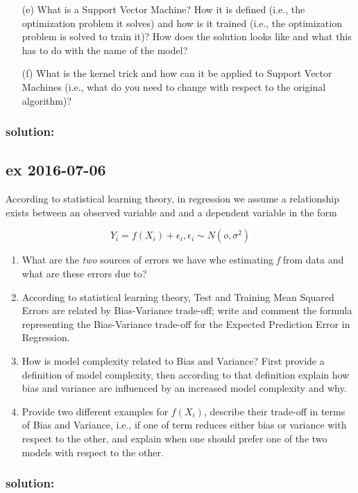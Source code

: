 \documentclass[a4paper,12pt,titlepage]{article} %
\begin{document}
\begin{itemize}
\item[(e)] What is a Support Vector Machine? How it is defined (i.e., the optimization problem it solves) and how is it trained (i.e., the optimization problem is solved to train it)? How does the solution looks like and what this has to do with the name of the model?
\item[(f)] What is the kernel trick and how can it be applied to Support Vector Machines (i.e., what do you need to change with respect to the original algorithm)?
\end{itemize}

\subsubsection{solution:}


\newpage
\subsection{ex 2016-07-06}
According to statistical learning theory, in regression we assume a relationship exists between an observed variable and and a dependent variable in the form 

$$ Y_{i} = f(X_{i}) + \epsilon_{i}, \epsilon_{i} \sim N(o, \sigma^{2})$$

\begin{enumerate}
\item What are the \textit{two} sources of errors we have whe estimating \textit{f} from data and what are these errors due to?
\item According to statistical learning theory, Test and Training Mean Squared Errors are related by Bias-Variance trade-off; write and comment the formula representing the Bias-Variance trade-off for the Expected Prediction Error in Regression.
\item How is model complexity related to Bias and Variance? First provide a definition of model complexity, then according to that definition explain how bias and variance are influenced by an increased model complexity and why.
\item Provide two different examples for $ f(X_{i}) $, describe their trade-off in terms of Bias and Variance, i.e., if one of term reduces either bias or variance with respect to the other, and explain when one should prefer one of the two models with respect to the other.
\end{enumerate}

\subsubsection{solution:}
\end{document}

